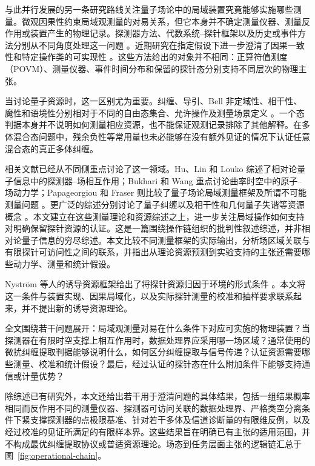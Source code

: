 \documentclass[UTF8,11pt,a4paper,fontset=none]{ctexart}
\begin{document}
与此并行发展的另一条研究路线关注量子场论中的局域装置究竟能够实施哪些测量。微观因果性约束局域观测量的对易关系，但它本身并不确定测量仪器、测量反作用或装置产生的物理记录。探测器方法、代数系统--探针框架以及历史或事件方法分别从不同角度处理这一问题 \cite{Sorkin1993,BorstenJubbKells2021,PoloGomez2022,FewsterVerch2020,AnastopoulosSavvidou2012,AnastopoulosSavvidou2019,Papageorgiou2024}。近期研究在指定假设下进一步澄清了因果一致性和特定操作类的可实现性 \cite{BostelmannFewsterRuep2021,FewsterJubbRuep2023,MandryschNavascues2025,MandryschSimmonsNavascues2026,Oeckl2026,Simmons2026}。这些方法给出的对象并不相同：正算符值测度（POVM）、测量仪器、事件时间分布和保留的探针态分别支持不同层次的物理主张。

当讨论量子资源时，这一区别尤为重要。纠缠、导引、Bell 非定域性、相干性、魔性和语境性分别相对于不同的自由态集合、允许操作及测量场景定义 \cite{HorodeckiEtAl2009,WisemanJonesDoherty2007,Uola2020,BaumgratzCramerPlenio2014,StreltsovAdessoPlenio2017,Howard2014,Schmid2022,Spekkens2005}。一个态判据本身并不说明如何测量相应资源，也不能保证观测记录排除了其他解释。在多体混合态问题中，残余负性等常用量也未必能够在没有额外见证的情况下认证任意混合态的真正多体纠缠。

相关文献已经从不同侧重点讨论了这一领域。Hu、Lin 和 Louko 综述了相对论量子信息中的探测器--场相互作用；Bukhari 和 Wang 重点讨论曲率时空中的原子--场动力学；Papageorgiou 和 Fraser 则比较了量子场论局域测量框架及所谓不可能测量问题 \cite{HuLinLouko2012,BukhariWang2024,Papageorgiou2024}。更广泛的综述分别讨论了量子纠缠以及相干性和几何量子失谐等资源概念 \cite{HorodeckiEtAl2009,Hu2018}。本文建立在这些测量理论和资源综述之上，进一步关注局域操作如何支持对明确保留探针资源的认证。这是一篇围绕操作链组织的批判性叙述综述，并非相对论量子信息的穷尽综述。本文比较不同测量框架的实际输出，分析场区域关联与有限探针可访问性之间的联系，并指出从理论资源预测到实验支持的主张还需要哪些动力学、测量和统计假设。

Nystr\"om 等人的诱导资源框架给出了将探针资源归因于环境的形式条件 \cite{Nystrom2026Induced}。本文将这一条件与装置实现、因果局域化，以及实际探针测量的校准和抽样要求联系起来，并不提出新的诱导资源理论。

全文围绕若干问题展开：局域观测量对易在什么条件下对应可实施的物理装置？当探测器在有限时空支撑上相互作用时，数据处理界应采用哪一场区域？通常使用的微扰纠缠提取判据能够说明什么，如何区分纠缠提取与信号传递？认证资源需要哪些测量、校准和统计假设？最后，经过认证的探针态在什么附加条件下能够支持通信或计量优势？

除综述已有研究外，本文还给出若干用于澄清问题的具体结果，包括一组结果概率相同而反作用不同的测量仪器、探测器可访问关联的数据处理界、严格类空分离条件下紧支撑探测器的点极限基准、针对若干多体及信道诊断量的有限维反例，以及经过校准的见证所满足的有限样本界。这些结果旨在明确已有主张的适用范围，并不构成最优纠缠提取协议或普适资源理论。场态到任务层面主张的逻辑链汇总于图~\ref{fig:operational-chain}。
\end{document}
